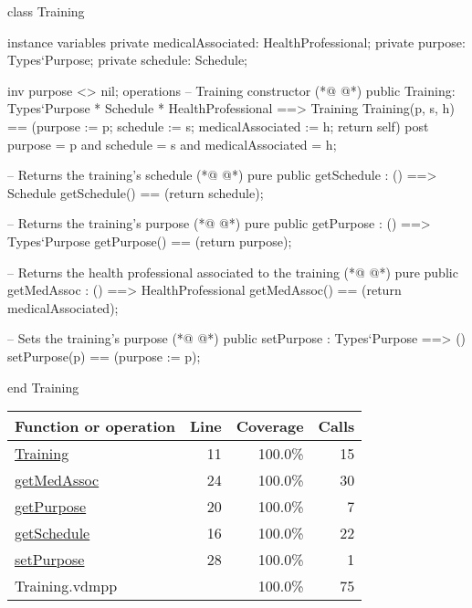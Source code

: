 \begin{vdmpp}[breaklines=true]
class Training
 
instance variables
 private medicalAssociated: HealthProfessional;
 private purpose: Types`Purpose;
 private schedule: Schedule;

 inv purpose <> nil;
operations
 -- Training constructor
(*@
\label{Training:11}
@*)
 public Training: Types`Purpose * Schedule * HealthProfessional ==> Training
   Training(p, s, h) == (purpose := p; schedule := s; medicalAssociated := h; return self)
 post purpose = p and schedule = s and medicalAssociated = h;
 
 -- Returns the training's schedule
(*@
\label{getSchedule:16}
@*)
 pure public getSchedule : () ==> Schedule
   getSchedule() == (return schedule);
 
 -- Returns the training's purpose
(*@
\label{getPurpose:20}
@*)
  pure public getPurpose : () ==> Types`Purpose
  getPurpose() == (return purpose); 
 
 -- Returns the health professional associated to the training
(*@
\label{getMedAssoc:24}
@*)
 pure public getMedAssoc : () ==> HealthProfessional
  getMedAssoc() == (return medicalAssociated); 
 
 -- Sets the training's purpose
(*@
\label{setPurpose:28}
@*)
 public setPurpose : Types`Purpose ==> ()
   setPurpose(p) == (purpose := p);
 
 end Training
\end{vdmpp}
\bigskip
\begin{longtable}{|l|r|r|r|}
\hline
Function or operation & Line & Coverage & Calls \\
\hline
\hline
\hyperref[Training:11]{Training} & 11&100.0\% & 15 \\
\hline
\hyperref[getMedAssoc:24]{getMedAssoc} & 24&100.0\% & 30 \\
\hline
\hyperref[getPurpose:20]{getPurpose} & 20&100.0\% & 7 \\
\hline
\hyperref[getSchedule:16]{getSchedule} & 16&100.0\% & 22 \\
\hline
\hyperref[setPurpose:28]{setPurpose} & 28&100.0\% & 1 \\
\hline
\hline
Training.vdmpp & & 100.0\% & 75 \\
\hline
\end{longtable}

